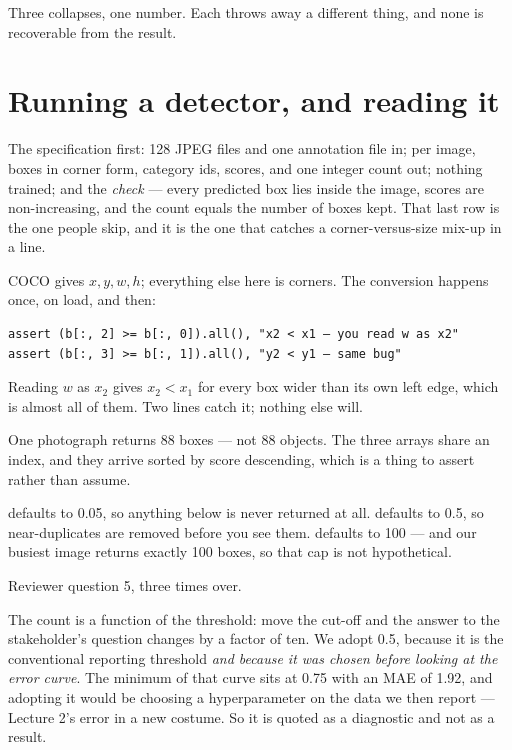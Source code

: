 \documentclass[11pt,a4paper]{article}
\begin{document}
Three collapses, one number. Each throws away a different thing, and none is
recoverable from the result.

\section{Running a detector, and reading it}

The specification first: 128 JPEG files and one annotation file in; per image,
boxes in corner form, category ids, scores, and one integer count out; nothing
trained; and the \emph{check} --- every predicted box lies inside the image,
scores are non-increasing, and the count equals the number of boxes kept. That
last row is the one people skip, and it is the one that catches a
corner-versus-size mix-up in a line.

\begin{keybox}[title={Convert once, at the edge, and assert it}]
COCO gives $x, y, w, h$; everything else here is corners. The conversion
happens once, on load, and then:
\begin{verbatim}
assert (b[:, 2] >= b[:, 0]).all(), "x2 < x1 — you read w as x2"
assert (b[:, 3] >= b[:, 1]).all(), "y2 < y1 — same bug"
\end{verbatim}
Reading $w$ as $x_2$ gives $x_2 < x_1$ for every box wider than its own left
edge, which is almost all of them. Two lines catch it; nothing else will.
\end{keybox}

One photograph returns 88 boxes --- not 88 objects. The three arrays share an
index, and they arrive sorted by score descending, which is a thing to assert
rather than assume.

\begin{failbox}[title={Failure condition --- there is already a cut-off, and it is not yours}]
 defaults to 0.05, so anything below is never returned
at all.  defaults to 0.5, so near-duplicates are removed
before you see them.  defaults to 100 --- and
our busiest image returns exactly 100 boxes, so that cap is not hypothetical.

Reviewer question 5, three times over.
\end{failbox}

The count is a function of the threshold: move the cut-off and the answer to
the stakeholder's question changes by a factor of ten. We adopt 0.5, because it
is the conventional reporting threshold \emph{and because it was chosen before
looking at the error curve}. The minimum of that curve sits at 0.75 with an MAE
of 1.92, and adopting it would be choosing a hyperparameter on the data we then
report --- Lecture 2's error in a new costume. So it is quoted as a diagnostic
and not as a result.
\end{document}
